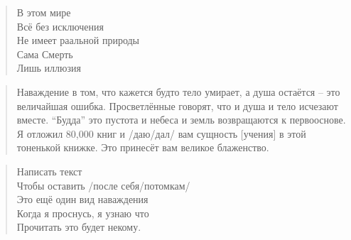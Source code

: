 \begin{ver}
  \begin{quote}
    \begin{verses}
      В этом мире\\
      Всё без исключения\\
      Не имеет раальной природы\\
      Сама Смерть\\
      Лишь иллюзия\\
    \end{verses}
  \end{quote}
\end{ver}


\begin{ver}
  \begin{quote}
    Наваждение в том, что кажется будто тело умирает, а душа остаётся
    -- это величайшая ошибка.
    Просветлённые говорят, что и душа и тело исчезают
    вместе. ``Будда'' это пустота и небеса и земль возвращаются к
    первооснове. Я отложил 80,000 книг и /даю/дал/ вам сущность
    [учения] в этой тоненькой книжке. Это принесёт вам великое блаженство.
  \end{quote}
\end{ver}

\begin{ver}
  \begin{quote}
    \begin{verses}
      Написать текст\\
      Чтобы оставить /после себя/потомкам/\\
      Это ещё один вид наваждения\\
      Когда я проснусь, я узнаю что\\
      Прочитать это будет некому.
    \end{verses}
  \end{quote}
\end{ver}

